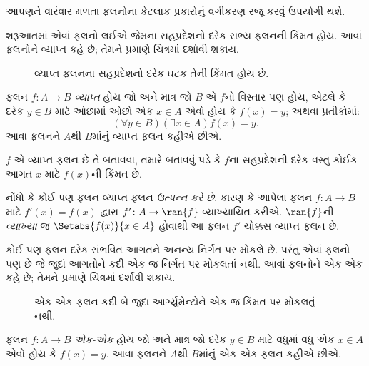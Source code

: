 \begingroup
\makeatletter{}\makeatother

\label{guunit:OLP-0022}


\begin{explain}
આપણને વારંવાર મળતા ફલનોના કેટલાક પ્રકારોનું
વર્ગીકરણ રજૂ કરવું ઉપયોગી થશે.

શરૂઆતમાં એવાં ફલનો લઈએ જેમના સહપ્રદેશનો દરેક સભ્ય
ફલનની કિંમત હોય. આવાં ફલનોને વ્યાપ્ત કહે છે;
તેમને  પ્રમાણે ચિત્રમાં દર્શાવી શકાય.

\begin{figure}
  \caption{વ્યાપ્ત ફલનના સહપ્રદેશનો દરેક
    ઘટક તેની કિંમત હોય છે.}
\end{figure}
\end{explain}

\begin{defn}[વ્યાપ્ત ફલન]
ફલન $f \colon A \rightarrow B$ \emph{વ્યાપ્ત}
હોય જો અને માત્ર જો $B$ એ $f$નો વિસ્તાર પણ હોય, એટલે કે
દરેક $y \in B$ માટે ઓછામાં ઓછો એક $x \in A$
એવો હોય કે $f(x) = y$; અથવા પ્રતીકોમાં:
\[
  (\forall y \in B)(\exists x \in A)f(x) = y.
\]
આવા ફલનને $A$થી $B$માંનું વ્યાપ્ત ફલન કહીએ છીએ.
\end{defn}

\begin{explain}
$f$ એ વ્યાપ્ત ફલન છે તે બતાવવા, તમારે બતાવવું પડે
કે $f$ના સહપ્રદેશની દરેક વસ્તુ કોઈક આગત $x$ માટે
$f(x)$ની કિંમત છે.

નોંધો કે કોઈ પણ ફલન વ્યાપ્ત ફલન
\emph{ઉત્પન્ન કરે છે}. કારણ કે આપેલા ફલન
$f \colon A \to B$ માટે $f'(x) = f(x)$ દ્વારા
$f' \colon A \to \ran{f}$ વ્યાખ્યાયિત કરીએ.
$\ran{f}$ની \emph{વ્યાખ્યા} જ
$\Setabs{f(x)}{x \in A}$ હોવાથી આ ફલન
$f'$ ચોક્કસ વ્યાપ્ત ફલન છે.
\end{explain}

\begin{explain}
કોઈ પણ ફલન દરેક સંભવિત આગતને અનન્ય નિર્ગત પર મોકલે છે.
પરંતુ એવાં ફલનો પણ છે જે જુદાં આગતોને કદી એક જ
નિર્ગત પર મોકલતાં નથી. આવાં ફલનોને એક-એક
કહે છે; તેમને  પ્રમાણે ચિત્રમાં
દર્શાવી શકાય.
\begin{figure}
  \caption{એક-એક ફલન કદી બે જુદા આર્ગ્યુમેન્ટોને
    એક જ કિંમત પર મોકલતું નથી.}
\end{figure}
\end{explain}

\begin{defn}[એક-એક ફલન]
ફલન $f \colon A \rightarrow B$ \emph{એક-એક}
હોય જો અને માત્ર જો દરેક $y \in B$ માટે વધુમાં વધુ
એક $x \in A$ એવો હોય કે $f(x) = y$.
આવા ફલનને $A$થી $B$માંનું એક-એક ફલન કહીએ છીએ.
\end{defn}

